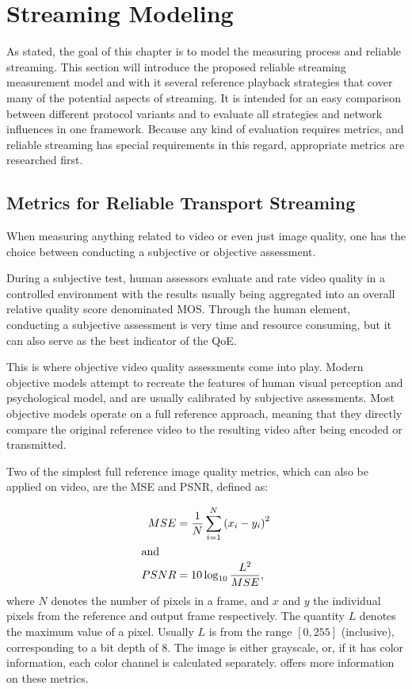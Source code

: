 \section{Streaming Modeling}
\label{c3:sec:modeling}

As stated, the goal of this chapter is to model the measuring process and reliable streaming. This section will introduce the proposed reliable streaming measurement model and with it several reference playback strategies that cover many of the potential aspects of streaming. It is intended for an easy comparison between different protocol variants and to evaluate all strategies and network influences in one framework. Because any kind of evaluation requires metrics, and reliable streaming has special requirements in this regard, appropriate metrics are researched first.


\subsection{Metrics for Reliable Transport Streaming}
\label{c3:sec:metrics}

When measuring anything related to video or even just image quality, one has the choice between conducting a subjective or objective assessment. 

During a subjective test, human assessors evaluate and rate video quality in a controlled environment with the results usually being aggregated into an overall relative quality score denominated \gls{MOS}. Through the human element, conducting a subjective assessment is very time and resource consuming, but it can also serve as the best indicator of the \gls{QoE}.

This is where objective video quality assessments come into play. Modern objective models attempt to recreate the features of human visual perception and psychological model, and are usually calibrated by subjective assessments. Most objective models operate on a full reference approach, meaning that they directly compare the original reference video to the resulting video after being encoded or transmitted.

Two of the simplest full reference image quality metrics, which can also be applied on video, are the \gls{MSE} and \gls{PSNR}, defined as:


\begin{align}
	MSE &= \frac{1}{N} \sum_{i=1}^{N}{(x_i - y_i)}^2\\
	\shortintertext{and}
	PSNR &= 10 \log_{10} \frac{L^2}{MSE},
\end{align}
%
where $N$ denotes the number of pixels in a frame, and $x$ and $y$ the individual pixels from the reference and output frame respectively. The quantity $L$ denotes the maximum value of a pixel. Usually $L$ is from the range $[0,255]$ (inclusive), corresponding to a bit depth of \SI{8}{\bit}. The image is either grayscale, or, if it has color information, each color channel is calculated separately. \cite{objective-vqa} offers more information on these metrics.

